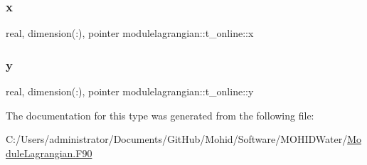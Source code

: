 \subsubsection{\texorpdfstring{x}{x}}
{\footnotesize\ttfamily real, dimension(\+:), pointer modulelagrangian\+::t\+\_\+online\+::x\hspace{0.3cm}{\ttfamily [private]}}

\mbox{\label{structmodulelagrangian_1_1t__online_a9cf18692f708a30e770df6b1f1e1dfcb}} 
\subsubsection{\texorpdfstring{y}{y}}
{\footnotesize\ttfamily real, dimension(\+:), pointer modulelagrangian\+::t\+\_\+online\+::y\hspace{0.3cm}{\ttfamily [private]}}



The documentation for this type was generated from the following file\+:\begin{DoxyCompactItemize}
\item 
C\+:/\+Users/administrator/\+Documents/\+Git\+Hub/\+Mohid/\+Software/\+M\+O\+H\+I\+D\+Water/\mbox{\hyperlink{_module_lagrangian_8_f90}{Module\+Lagrangian.\+F90}}\end{DoxyCompactItemize}
